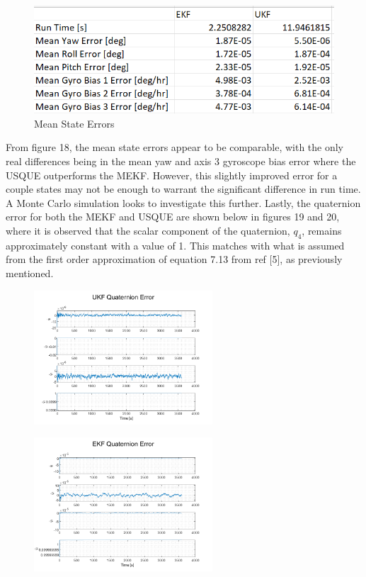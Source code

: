 \documentclass[12pt]{report}
\begin{document}
\begin{figure}[h!]
	\centering
	\includegraphics[width = .8\textwidth]{Table.png}
	\caption{Mean State Errors}
	\label{fig:Part B}
\end{figure}

\noindent From figure 18, the mean state errors appear to be comparable, with the only real differences being in the mean yaw and axis 3 gyroscope bias error where the USQUE outperforms the MEKF. However, this slightly improved error for a couple states may not be enough to warrant the significant difference in run time. A Monte Carlo simulation looks to investigate this further. Lastly, the quaternion error for both the MEKF and USQUE are shown below in figures 19 and 20, where it is observed that the scalar component of the quaternion, $q_4$, remains approximately constant with a value of 1. This matches with what is assumed from the first order approximation of equation 7.13 from ref [5], as previously mentioned. 

\begin{figure}[h!]
	\centering
	\begin{minipage}{.5\textwidth}
		\centering
		\includegraphics[height=5cm, keepaspectratio]{ukfQuatErr.png}
		\label{fig:ex1}
	\end{minipage}%
	\begin{minipage}{.5\textwidth}
		\centering
		\includegraphics[height=5cm, keepaspectratio]{ekfQuatErr.png}
		\label{fig:ex2}
	\end{minipage}
\end{figure}
\end{document}
